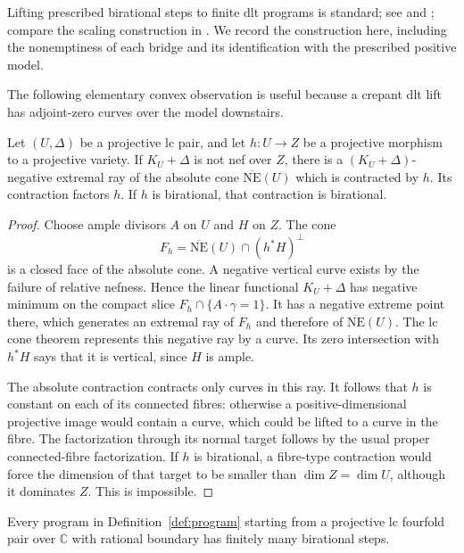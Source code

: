Lifting prescribed birational steps to finite dlt programs is standard;
see \cite[Lemma~3.1]{LazicMoragaTsakanikas} and
\cite[Lemma~2.6]{HanLiuZhuang2025}; compare the scaling construction in
\cite[Remark~2.9]{BirkarLC}.  We record the construction here, including
the nonemptiness of each bridge and its identification with the
prescribed positive model.

The following elementary convex observation is useful because a
crepant dlt lift has adjoint-zero curves over the model downstairs.

\begin{lemma}\label{lem:vertical-ray}
Let $(U,\Delta)$ be a projective lc pair, and let $h:U\to Z$ be a
projective morphism to a projective variety.  If $K_U+\Delta$ is not
nef over $Z$, there is a $(K_U+\Delta)$-negative extremal ray of the
absolute cone $\overline{\mathrm{NE}}(U)$ which is contracted by $h$.
Its contraction factors $h$.  If $h$ is birational, that contraction
is birational.
\end{lemma}

\begin{proof}
Choose ample divisors $A$ on $U$ and $H$ on $Z$.  The cone
\[
 F_h=\overline{\mathrm{NE}}(U)\cap(h^*H)^\perp
\]
is a closed face of the absolute cone.  A negative vertical curve
exists by the failure of relative nefness.  Hence the linear
functional $K_U+\Delta$ has negative minimum on the compact slice
$F_h\cap\{A\cdot\gamma=1\}$.  It has a negative extreme point
there, which generates an extremal ray of $F_h$ and therefore of
$\overline{\mathrm{NE}}(U)$.  The lc cone theorem represents this
negative ray by a curve.  Its zero intersection with $h^*H$ says
that it is vertical, since $H$ is ample.

The absolute contraction contracts only curves in this ray.
It follows that $h$ is constant on each of its connected fibres:
otherwise a positive-dimensional projective image would contain
a curve, which could be lifted to a curve in the fibre.  The
factorization through its normal target follows by the usual
proper connected-fibre factorization.  If $h$ is birational, a
fibre-type contraction would force the dimension of that target
to be smaller than $\dim Z=\dim U$, although it dominates $Z$.
This is impossible.
\end{proof}

\begin{proposition}\label{prop:lc-lift}
Every program in Definition~\ref{def:program} starting from a
projective lc fourfold pair over $\mathbb C$ with rational boundary has finitely many
birational steps.
\end{proposition}

